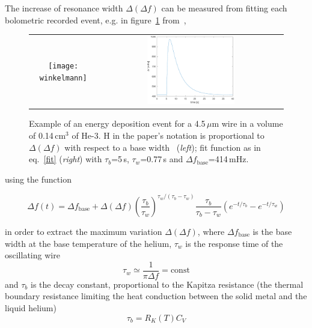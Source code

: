 \documentclass[a4paper,12pt]{article}
\begin{document}
The increase of resonance width $\Delta (\Delta f)$ can be measured from fitting each bolometric recorded event, e.g. in figure~\ref{fig:winkelmann} from~\cite{winkelmann},
\begin{figure}[!ht]
  \begin{center}
    \begin{tabular}{cc}
    \texttt{[image: winkelmann]} &
    \includegraphics[width=0.49\textwidth]{winkelmann_fit.pdf}
    \end{tabular}
  \end{center}
  \caption{Example of an energy deposition event for a 4.5\,$\mu$m wire in a volume of 0.14\,cm$^3$ of He-3. H in the paper's notation is proportional to $\Delta (\Delta f)$ with respect to a base width~\cite{winkelmann} (\textit{left}); fit function as in eq.~\ref{fit} (\textit{right}) with $\tau_b$=5\,s, $\tau_w$=0.77\,s and $\Delta f_\mathrm{base}$=414\,mHz.}
  \label{fig:winkelmann}
\end{figure}
using the function

\begin{equation}
  \Delta f(t)= \Delta f_\mathrm{base} + \Delta (\Delta f) {\left( \frac{\tau_b}{\tau_w} \right)}^{\tau_w/(\tau_b-\tau_w)} \frac{\tau_b}{\tau_b - \tau_w} \left( e^{-t/\tau_b} - e^{-t/\tau_w} \right)
\label{fit}
\end{equation}

in order to extract the maximum variation $\Delta (\Delta f)$, where $\Delta f_\mathrm{base}$ is the base width at the base temperature of the helium, $\tau_w$ is the response time of the oscillating wire
\begin{equation}
  \tau_w \simeq \frac{1}{\pi \Delta f} = \mathrm{const}
\end{equation}
and $\tau_b$ is the decay constant, proportional to the Kapitza resistance (the thermal boundary resistance limiting the heat conduction between the solid metal and the liquid helium)
\begin{equation}
  \tau_b = R_K(T) C_V
\end{equation}
\end{document}
